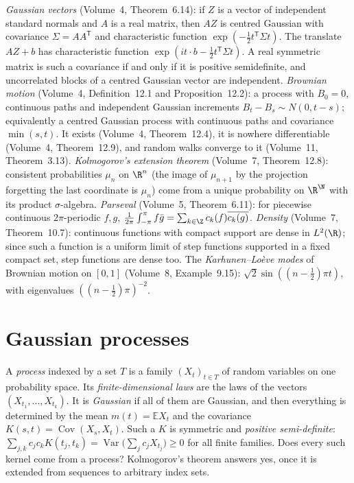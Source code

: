 \begin{reminder}
\emph{Gaussian vectors} (Volume~4, Theorem~6.14): if $Z$ is a vector of independent standard normals and $A$ is a real matrix, then $AZ$ is centred Gaussian with covariance $\Sigma=AA^{\mathsf T}$ and characteristic function $\exp(-\tfrac12 t^{\mathsf T}\Sigma t)$. The translate $AZ+b$ has characteristic function $\exp(it\cdot b-\tfrac12 t^{\mathsf T}\Sigma t)$. A real symmetric matrix is such a covariance if and only if it is positive semidefinite, and uncorrelated blocks of a centred Gaussian vector are independent.
\emph{Brownian motion} (Volume~4, Definition~12.1 and Proposition~12.2): a process with $B_0=0$, continuous paths and independent Gaussian increments
$B_t-B_s\sim N(0,t-s)$; equivalently a centred Gaussian process with continuous paths and covariance $\min(s,t)$. It exists (Volume~4, Theorem~12.4), it is nowhere differentiable (Volume~4,
Theorem~12.9), and random walks converge to it (Volume~11, Theorem~3.13). \emph{Kolmogorov's extension theorem} (Volume~7, Theorem~12.8): consistent probabilities $\mu_n$ on $\R^n$ (the image of
$\mu_{n+1}$ by the projection forgetting the last coordinate is $\mu_n$) come from a unique probability on $\R^\N$ with its product $\sigma$-algebra. \emph{Parseval} (Volume~5, Theorem~6.11): for
piecewise continuous $2\pi$-periodic $f,g$, $\frac1{2\pi}\int_{-\pi}^{\pi}f\bar g=\sum_{k\in\Z}c_k(f)\overline{c_k(g)}$. \emph{Density} (Volume~7, Theorem~10.7): continuous functions with compact support are dense in $L^2(\R)$; since such a function is a uniform limit of step functions supported in a fixed compact set,
step functions are dense too. The \emph{Karhunen--Lo\`eve modes} of Brownian motion on $[0,1]$ (Volume~8, Example~9.15): $\sqrt2\sin((n-\frac12)\pi t)$, with eigenvalues $((n-\frac12)\pi)^{-2}$.
\end{reminder}

\section{Gaussian processes}

A \emph{process} indexed by a set $T$ is a family $(X_t)_{t\in T}$ of random variables on one probability space. Its \emph{finite-dimensional laws} are the laws of the vectors $(X_{t_1},\dots,X_{t_k})$. It is
\emph{Gaussian} if all of them are Gaussian, and then everything is determined by the mean $m(t)=\mathbb E X_t$ and the covariance $K(s,t)=\operatorname{Cov}(X_s,X_t)$. Such a $K$ is symmetric and
\emph{positive semi-definite}: $\sum_{j,k}c_jc_kK(t_j,t_k)=\operatorname{Var}\bigl(\sum_jc_jX_{t_j}\bigr)\ge0$ for all finite families. Does every such kernel come from a process? Kolmogorov's theorem
answers yes, once it is extended from sequences to arbitrary index sets.

